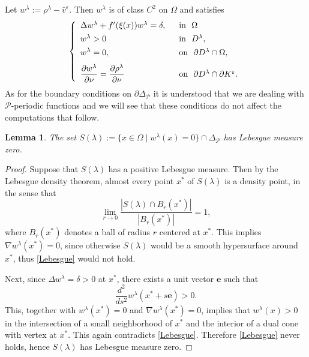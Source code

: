\documentclass[a4paper,12pt,fullpage]{article}
\numberwithin{equation}{section}
\newtheorem{Lemma}{Lemma}[section]
\def\ep{\varepsilon}
\begin{document}
Let $w^\lambda:=\rho^\lambda-\bar{v}^\ep$. Then $w^\lambda$ is of class $C^2$ on $\Omega$ and satisfies
\begin{equation}\label{w-lambda}
\left\{
\begin{array}{ll}
\Delta w^\lambda +f'(\xi(x))w^\lambda= \delta,  \ \ &\hbox{in}\ \ \Omega\\[4pt]
w^\lambda>0 \ \ &\hbox{in}\ \ D^\lambda,\\[4pt]
\displaystyle
w^\lambda=0, \ \ &\hbox{on}\ \ \partial D^\lambda\cap\Omega,\\[7pt]
\displaystyle
\frac{\partial w^\lambda}{\partial\nu}=\frac{\partial \rho^\lambda}{\partial\nu}\ \ \ &\hbox{on}\ \ \partial D^\lambda\cap \partial K^\ep.
\end{array}\right.
\end{equation}
As for the boundary conditions on $\partial\Delta_{\mathcal P}$ it is understood that we are dealing with ${\mathcal P}$-periodic functions and we will see that these conditions do not affect the computations that follow. 

\begin{Lemma}\label{wlambda=0}
The set $S(\lambda):=\{x\in\Omega\mid w^\lambda(x)=0\}\cap \Delta_{\mathcal P}$ has Lebesgue measure zero.
\end{Lemma}

\begin{proof}
Suppose that $S(\lambda)$ has a positive Lebesgue measure. Then by the Lebesgue density theorem, almost every point $x^*$ of $S(\lambda)$ is a density point, in the sense that
\begin{equation}\label{Lebesgue}
\lim_{r\to 0}\frac{|S(\lambda)\cap B_r(x^*)|}{|B_r(x^*)|}=1,
\end{equation}
where $B_r(x^*)$ denotes a ball of radius $r$ centered at $x^*$. This implies $\nabla w^\lambda(x^*)=0$, since otherwise $S(\lambda)$ would be a smooth hypersurface around $x^*$, thus \eqref{Lebesgue} would not hold. 

Next, since $\Delta w^\lambda=\delta>0$ at $x^*$, there exists a unit vector ${\boldsymbol e}$ such that
\[
\frac{d^2}{ds^2} w^\lambda(x^*+s{\boldsymbol e})>0.
\]
This, together with $w^\lambda(x^*)=0$ and $\nabla w^\lambda(x^*)=0$, implies that $w^\lambda(x)>0$ in the intersection of a small neighborhood of $x^*$ and the interior of a dual cone with vertex at $x^*$. This again contradicts \eqref{Lebesgue}. Therefore \eqref{Lebesgue} never holds, hence $S(\lambda)$ has Lebesgue measure zero.
\end{proof}
\end{document}
